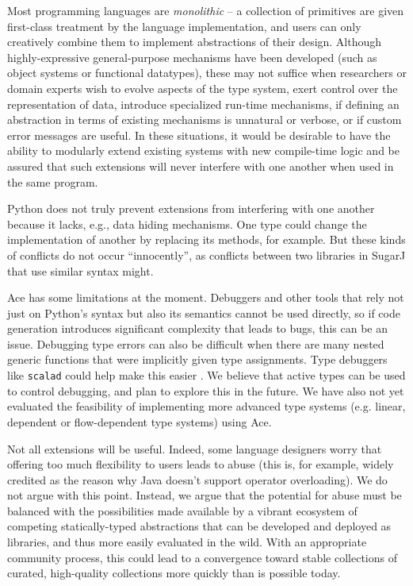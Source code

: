 \documentclass[10pt,preprint]{sigplanconf}
\begin{document}
{Most programming languages are {\em monolithic} -- a collection of primitives are given first-class treatment by the language implementation, and users can only creatively combine them to implement  abstractions of their design. Although highly-expressive general-purpose mechanisms have been developed (such as object systems or functional datatypes), these may not suffice when researchers or domain experts wish to evolve aspects of the type system, exert control over the representation of data, introduce specialized run-time mechanisms, if defining an abstraction in terms of existing mechanisms is unnatural or verbose, or if custom error messages are useful. In these situations, it would be desirable to have the ability to modularly extend existing systems with new compile-time logic and be assured that such extensions will never interfere with one another when used in the same program.

Python does not truly prevent extensions from interfering with one another because it lacks, e.g., data hiding mechanisms. One type could change the implementation of another by replacing its methods, for example. But these kinds of conflicts do not occur ``innocently'', as conflicts between two libraries in SugarJ that use similar syntax might.
 



Ace has some limitations at the moment. Debuggers and other tools that rely not just on Python's syntax but also its semantics cannot be used directly, so if code generation introduces significant complexity that leads to bugs, this can be an issue. Debugging type errors can also be difficult when there are many nested generic functions that were implicitly given type assignments. Type debuggers like \verb|scalad| could help make this easier \cite{scalad}. We believe that active types can be used to control debugging, and plan to explore this in the future. We have also not yet evaluated the feasibility of implementing more advanced type systems (e.g. linear, dependent or flow-dependent type systems) using Ace.

Not all extensions will be useful. Indeed, some language designers worry that offering too much flexibility to users leads to abuse (this is, for example, widely credited as the reason why Java doesn't support operator overloading). We do not argue with this point. Instead, we argue that the potential for abuse must be balanced with the possibilities made available by a vibrant ecosystem of competing statically-typed abstractions that can be developed and deployed as libraries, and thus more easily evaluated in the wild. With an appropriate community process, this could lead to a convergence toward stable collections of curated, high-quality collections more quickly than is possible today. %
 
}
\end{document}
